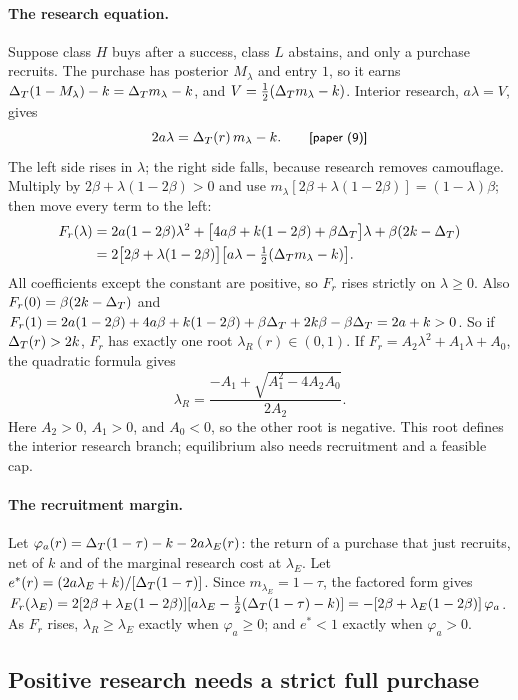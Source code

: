 \paragraph{The research equation.} Suppose class \(H\) buys after a success, class \(L\) abstains, and only a purchase
recruits. The purchase has posterior \(M_\lambda\) and entry \(1\), so it earns \(\Delta_T(1-M_\lambda)-k=\Delta_T m_\lambda-k\),
and \(V=\tfrac12(\Delta_T m_\lambda-k)\). Interior research, \(a\lambda=V\), gives
\begin{equation*}
2a\lambda=\DT(r)\,m_\lambda-k .\tag*{\paper{(9)}}
\end{equation*}
The left side rises in \(\lambda\); the right side falls, because research removes camouflage. Multiply by
\(2\beta+\lambda(1-2\beta)>0\) and use \(m_\lambda[2\beta+\lambda(1-2\beta)]=(1-\lambda)\beta\); then move every term to
the left:
\begin{align*}
F_r(\lambda)&=2a(1-2\beta)\lambda^2+\bigl[4a\beta+k(1-2\beta)+\beta\Delta_T\bigr]\lambda+\beta(2k-\Delta_T)\\
&=2\bigl[2\beta+\lambda(1-2\beta)\bigr]\bigl[a\lambda-\tfrac12(\Delta_T m_\lambda-k)\bigr].
\end{align*}
All coefficients except the constant are positive, so \(F_r\) rises strictly on \(\lambda\ge0\). Also \(F_r(0)=\beta(2k-\Delta_T)\)
and \(F_r(1)=2a(1-2\beta)+4a\beta+k(1-2\beta)+\beta\Delta_T+2k\beta-\beta\Delta_T=2a+k>0\). So if \(\Delta_T(r)>2k\), \(F_r\) has exactly one
root \(\lambda_R(r)\in(0,1)\).
If \(F_r=A_2\lambda^2+A_1\lambda+A_0\), the quadratic formula gives
\[
\lambda_R=\frac{-A_1+\sqrt{A_1^2-4A_2A_0}}{2A_2}.
\]
Here \(A_2>0\), \(A_1>0\), and \(A_0<0\), so the other root is negative.
This root defines the interior research branch; equilibrium also needs recruitment and a feasible cap.

\paragraph{The recruitment margin.} Let \(\varphi_a(r)=\Delta_T(1-\tau)-k-2a\lambda_E(r)\): the return of a purchase that just
recruits, net of \(k\) and of the marginal research cost at \(\lambda_E\). Let \(e^*(r)=(2a\lambda_E+k)/[\Delta_T(1-\tau)]\).
Since \(m_{\lambda_E}=1-\tau\), the factored form gives
\(F_r(\lambda_E)=2[2\beta+\lambda_E(1-2\beta)][a\lambda_E-\tfrac12(\Delta_T(1-\tau)-k)]=-[2\beta+\lambda_E(1-2\beta)]\,\varphi_a\).
As \(F_r\) rises, \(\lambda_R\ge\lambda_E\) exactly when \(\varphi_a\ge0\); and \(e^*<1\) exactly when \(\varphi_a>0\).

\subsection{Positive research needs a strict full purchase}\label{sec:09_research-buy}

